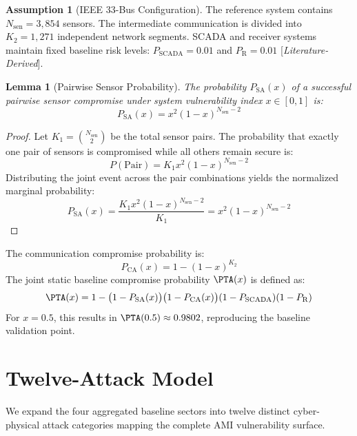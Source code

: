 \documentclass[12pt, oneside, a4paper]{report}
\newtheorem{lemma}[theorem]{Lemma}
\theoremstyle{definition}
\newtheorem{assumption}[theorem]{Assumption}
\theoremstyle{remark}
\newcommand{\litderived}{[\textit{Literature-Derived}]}
\newcommand{\Psa}{P_{\mathrm{SA}}}
\newcommand{\Pca}{P_{\mathrm{CA}}}
\newcommand{\Pscada}{P_{\mathrm{SCADA}}}
\renewcommand{\Pr}{P_{\mathrm{R}}}
\begin{document}
\begin{assumption}[IEEE 33-Bus Configuration]
The reference system contains $N_{\mathrm{sen}} = 3{,}854$ sensors. The intermediate communication is divided into $K_2 = 1{,}271$ independent network segments. SCADA and receiver systems maintain fixed baseline risk levels: $\Pscada = 0.01$ and $\Pr = 0.01$ \litderived.
\end{assumption}

\begin{lemma}[Pairwise Sensor Probability]
The probability $\Psa(x)$ of a successful pairwise sensor compromise under system vulnerability index $x \in [0, 1]$ is:
\begin{equation}
\Psa(x) = x^2 (1 - x)^{N_{\mathrm{sen}} - 2}
\end{equation}
\end{lemma}

\begin{proof}
Let $K_1 = \binom{N_{\mathrm{sen}}}{2}$ be the total sensor pairs. The probability that exactly one pair of sensors is compromised while all others remain secure is:
\begin{equation}
P(\text{Pair}) = K_1 x^2 (1 - x)^{N_{\mathrm{sen}} - 2}
\end{equation}
Distributing the joint event across the pair combinations yields the normalized marginal probability:
\begin{equation}
\Psa(x) = \frac{K_1 x^2 (1 - x)^{N_{\mathrm{sen}} - 2}}{K_1} = x^2 (1 - x)^{N_{\mathrm{sen}} - 2}
\end{equation}
\end{proof}

The communication compromise probability is:
\begin{equation}
\Pca(x) = 1 - (1 - x)^{K_2}
\end{equation}
The joint static baseline compromise probability $\PTA(x)$ is defined as:
\begin{equation}
\PTA(x) = 1 - \bigl(1 - \Psa(x)\bigr)\bigl(1 - \Pca(x)\bigr)(1 - \Pscada)(1 - \Pr)
\end{equation}
For $x=0.5$, this results in $\PTA(0.5) \approx 0.9802$, reproducing the baseline validation point.

\section{Twelve-Attack Model}
\label{sec:sm:twelve_attack}

We expand the four aggregated baseline sectors into twelve distinct cyber-physical attack categories mapping the complete AMI vulnerability surface.
\end{document}
